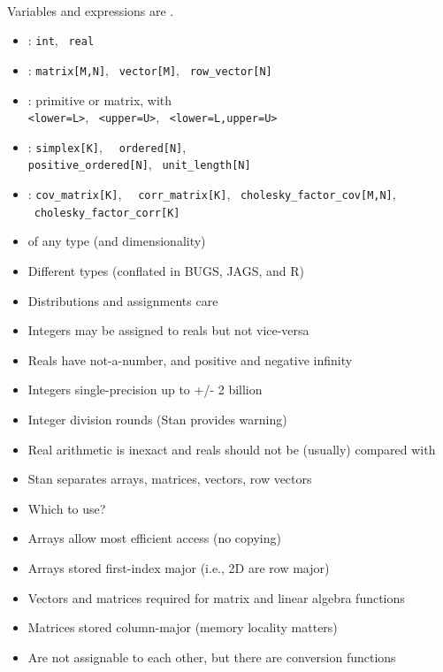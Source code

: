 \documentclass[10pt]{report}
\begin{document}
%
\\[3pt]
\hspace*{17pt}Variables and expressions are .
\begin{itemize}
\item {}: {\tt\small int}, \ {\tt\small real}
\item {}: {\tt\small matrix[M,N]}, \ {\tt\small vector[M]}, \ {\tt\small row\_vector[N]}
\item {}: primitive or matrix, with
  \\ {\tt\small <lower=L>}, \ {\tt\small <upper=U>}, \ {\tt\small <lower=L,upper=U>}
\item {}: {\tt\small simplex[K]}, \ {\tt\small
    ordered[N]},
  \\ {\tt\small positive\_ordered[N]}, \ {\tt\small unit\_length[N]}
\item {}: {\tt\small cov\_matrix[K]}, \ {\tt\small
    corr\_matrix[K]}, \ {\tt\small cholesky\_factor\_cov[M,N]}, \
  {\tt\small cholesky\_factor\_corr[K]}
\item {}  of any type (and dimensionality)
\end{itemize}


%
\begin{itemize}
\item Different types (conflated in BUGS, JAGS, and R)
\item Distributions and assignments care
\item Integers may be assigned to reals but not vice-versa
\item Reals have not-a-number, and positive and negative infinity
\item Integers single-precision up to +/- 2 billion
\item Integer division rounds (Stan provides warning)
\item Real arithmetic is inexact and reals should not be (usually) compared with \code{==}
\end{itemize}


%
\begin{itemize}
\item Stan separates arrays, matrices, vectors, row vectors
\item Which to use?
\item Arrays allow most efficient access (no copying)
\item Arrays stored first-index major (i.e., 2D are row major)
\item Vectors and matrices required for matrix and linear algebra functions
\item Matrices stored column-major (memory locality matters)
\item Are not assignable to each other, but there are conversion functions
\end{itemize}
\end{document}
